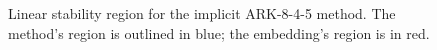 \documentclass[letterpaper,10pt,english]{sphinxmanual}
\begin{document}
\begin{figure}[htbp]
\caption{Linear stability region for the implicit ARK-8-4-5 method.  The method's
region is outlined in blue; the embedding's region is in red.}\end{figure}
\end{document}
